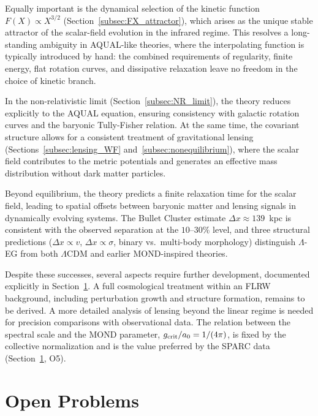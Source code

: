 \documentclass[11pt,a4paper]{article}
\begin{document}
Equally important is the dynamical selection of the kinetic function
$F(X) \propto X^{3/2}$ (Section~\ref{subsec:FX_attractor}), which arises as
the unique stable attractor of the scalar-field evolution in the infrared regime.
This resolves a long-standing ambiguity in AQUAL-like theories, where the
interpolating function is typically introduced by hand: the combined requirements
of regularity, finite energy, flat rotation curves, and dissipative relaxation
leave no freedom in the choice of kinetic branch.

In the non-relativistic limit (Section~\ref{subsec:NR_limit}), the theory
reduces explicitly to the AQUAL equation, ensuring consistency with galactic
rotation curves and the baryonic Tully-Fisher relation. At the same time,
the covariant structure allows for a consistent treatment of gravitational
lensing (Sections~\ref{subsec:lensing_WF} and~\ref{subsec:nonequilibrium}),
where the scalar field contributes to the metric potentials and generates an
effective mass distribution without dark matter particles.

Beyond equilibrium, the theory predicts a finite relaxation time for the
scalar field, leading to spatial offsets between baryonic matter and
lensing signals in dynamically evolving systems. The Bullet Cluster estimate
$\Delta x\approx 139$~kpc is consistent with the observed separation at the
$10$--$30\%$ level, and three structural predictions ($\Delta x\propto v$,
$\Delta x\propto\sigma$, binary vs.\ multi-body morphology) distinguish
$\Lambda$-EG from both $\Lambda$CDM and earlier MOND-inspired theories.

Despite these successes, several aspects require further development,
documented explicitly in Section~\ref{sec:openproblems}. A full cosmological
treatment within an FLRW background, including perturbation growth and structure
formation, remains to be derived. A more detailed analysis of lensing beyond
the linear regime is needed for precision comparisons with observational data.
The relation between the spectral scale and the MOND parameter,
$g_{\rm crit}/a_0 = 1/(4\pi)$, is fixed by the collective normalization and is
the value preferred by the SPARC data (Section~\ref{sec:openproblems}, O5).

\section{Open Problems}
\label{sec:openproblems}
\end{document}
